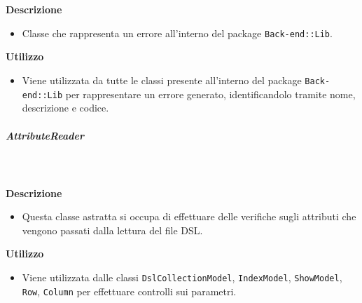 				\textbf{\\ \\ Descrizione} 
					\begin{itemize}
						\item[] Classe che rappresenta un errore all'interno del package \texttt{Back-end::Lib}.
					\end{itemize}      
				\textbf{Utilizzo}  
					\begin{itemize}
						\item[] Viene utilizzata da tutte le classi presente all'interno del package \texttt{Back-end::Lib} per rappresentare un errore generato, identificandolo tramite nome, descrizione e codice.
					\end{itemize}
			\subparagraph{AttributeReader}
				
				\textbf{\\ \\ Descrizione} 
					\begin{itemize}
						\item[] Questa classe astratta si occupa di effettuare delle verifiche sugli attributi che vengono passati dalla lettura del file DSL.
					\end{itemize}      
				\textbf{Utilizzo}  
					\begin{itemize}
						\item[] Viene utilizzata dalle classi \texttt{DslCollectionModel}, \texttt{IndexModel}, \texttt{ShowModel}, \texttt{Row}, \texttt{Column} per effettuare controlli sui parametri.
					\end{itemize}